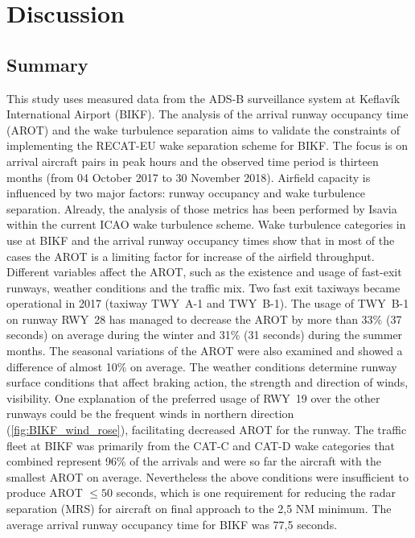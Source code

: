 


\chapter{Discussion}\label{cha:discussion}

\section{Summary}\label{sec:summary}
This study uses measured data from the ADS-B surveillance system at Keflavík International Airport (BIKF). The analysis of the arrival runway occupancy time (AROT) and the wake turbulence separation aims to validate the constraints of implementing the RECAT-EU wake  separation scheme for BIKF. The focus is on arrival aircraft pairs in peak hours and the observed time period is thirteen months (from 04 October 2017 to 30 November 2018). 
Airfield capacity is influenced by two major factors: runway occupancy and wake turbulence separation. Already, the analysis of those metrics has been performed by Isavia within the current ICAO wake turbulence scheme. Wake turbulence categories in use at BIKF and the arrival runway occupancy times show that in most of the cases the AROT is a limiting factor for increase of the airfield throughput.  \\
Different variables affect the AROT, such as the existence and usage of fast-exit runways, weather conditions and the traffic mix. Two fast exit taxiways became operational in 2017 (taxiway TWY~A-1 and TWY~B-1). The usage of TWY~B-1 on runway RWY~28 has managed to decrease the AROT by more than 33\% (37 seconds) on average during the winter and 31\% (31 seconds) during the summer months. The seasonal variations of the AROT were also examined and showed a difference of almost 10\% on average. The weather conditions determine runway surface conditions that affect braking action, the strength and direction of winds, visibility. One explanation of the preferred usage of RWY~19 over the other runways could be the frequent winds in northern direction (\ref{fig:BIKF_wind_rose}), facilitating decreased AROT for the runway. The traffic fleet at BIKF was primarily from the CAT-C and CAT-D wake categories that combined represent 96\% of the arrivals and were so far the aircraft with the smallest AROT on average. Nevertheless the above conditions were insufficient to produce AROT $\leq 50$ seconds, which is one requirement for reducing the radar separation (MRS) for aircraft on final approach to the 2,5 NM minimum. The average arrival runway occupancy time for BIKF was 77,5 seconds. \\
